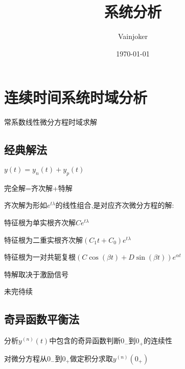 \documentclass{article}
\title{系统分析}
\author{Vainjoker}
\date{\today}
\begin{document}
    \maketitle
    \newpage

    \section{连续时间系统时域分析}%
    常系数线性微分方程时域求解
    \subsection{经典解法}%
    $y(t)=y_n(t)+y_p(t)$

    完全解=齐次解+特解

    齐次解为形如$e^{t\lambda} $的线性组合,是对应齐次微分方程的解:

    特征根为单实根齐次解$Ce^{t\lambda}$

    特征根为二重实根齐次解$(C_1t+C_0)e^{t\lambda}$

    特征根为一对共轭复根$(C\cos(\beta t)+D\sin(\beta t))e^{\alpha t}$

    特解取决于激励信号

    {未完待续}

    \subsection{奇异函数平衡法}%

    分析$y^(n)(t)$中包含的奇异函数判断$0_-$到$0_+$的连续性

    对微分方程从$0_-$到$0_+$做定积分求取$y^(n)(0_+)$
\end{document}
